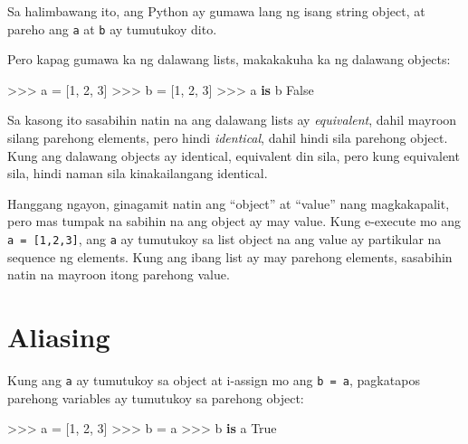 \documentclass[10pt,]{book}
\newenvironment{Shaded}{}{}
\newcommand{\DecValTok}[1]{\textcolor[rgb]{0.25,0.63,0.44}{#1}}
\newcommand{\KeywordTok}[1]{\textcolor[rgb]{0.00,0.44,0.13}{\textbf{#1}}}
\newcommand{\NormalTok}[1]{#1}
\newcommand{\OperatorTok}[1]{\textcolor[rgb]{0.40,0.40,0.40}{#1}}
\newcommand{\VariableTok}[1]{\textcolor[rgb]{0.10,0.09,0.49}{#1}}
\begin{document}
Sa halimbawang ito, ang Python ay gumawa lang ng isang string object, at
pareho ang \texttt{a} at \texttt{b} ay tumutukoy dito.

Pero kapag gumawa ka ng dalawang lists, makakakuha ka ng dalawang
objects:

\begin{Shaded}
\begin{Highlighting}[]
\OperatorTok{\textgreater{}\textgreater{}\textgreater{}}\NormalTok{ a }\OperatorTok{=}\NormalTok{ [}\DecValTok{1}\NormalTok{, }\DecValTok{2}\NormalTok{, }\DecValTok{3}\NormalTok{]}
\OperatorTok{\textgreater{}\textgreater{}\textgreater{}}\NormalTok{ b }\OperatorTok{=}\NormalTok{ [}\DecValTok{1}\NormalTok{, }\DecValTok{2}\NormalTok{, }\DecValTok{3}\NormalTok{]}
\OperatorTok{\textgreater{}\textgreater{}\textgreater{}}\NormalTok{ a }\KeywordTok{is}\NormalTok{ b}
\VariableTok{False}
\end{Highlighting}
\end{Shaded}

Sa kasong ito sasabihin natin na ang dalawang lists ay
\emph{equivalent}, dahil mayroon silang parehong elements, pero hindi
\emph{identical}, dahil hindi sila parehong object. Kung ang dalawang
objects ay identical, equivalent din sila, pero kung equivalent sila,
hindi naman sila kinakailangang identical.

 

Hanggang ngayon, ginagamit natin ang ``object'' at ``value'' nang
magkakapalit, pero mas tumpak na sabihin na ang object ay may value.
Kung e-execute mo ang \texttt{a\ =\ {[}1,2,3{]}}, ang \texttt{a} ay
tumutukoy sa list object na ang value ay partikular na sequence ng
elements. Kung ang ibang list ay may parehong elements, sasabihin natin
na mayroon itong parehong value.

 

\section{Aliasing}\label{aliasing}

 

Kung ang \texttt{a} ay tumutukoy sa object at i-assign mo ang
\texttt{b\ =\ a}, pagkatapos parehong variables ay tumutukoy sa parehong
object:

\begin{Shaded}
\begin{Highlighting}[]
\OperatorTok{\textgreater{}\textgreater{}\textgreater{}}\NormalTok{ a }\OperatorTok{=}\NormalTok{ [}\DecValTok{1}\NormalTok{, }\DecValTok{2}\NormalTok{, }\DecValTok{3}\NormalTok{]}
\OperatorTok{\textgreater{}\textgreater{}\textgreater{}}\NormalTok{ b }\OperatorTok{=}\NormalTok{ a}
\OperatorTok{\textgreater{}\textgreater{}\textgreater{}}\NormalTok{ b }\KeywordTok{is}\NormalTok{ a}
\VariableTok{True}
\end{Highlighting}
\end{Shaded}
\end{document}
